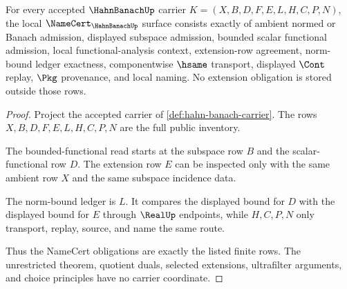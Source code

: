 \begin{theorem}
\label{thm:hahn-banach-namecert-obligations}
For every accepted $\HahnBanachUp$ carrier $K=(X,B,D,F,E,L,H,C,P,N)$, the local $\NameCert_{\HahnBanachUp}$ surface consists exactly of ambient normed or Banach admission, displayed subspace admission, bounded scalar functional admission, local functional-analysis context, extension-row agreement, norm-bound ledger exactness, componentwise $\hsame$ transport, displayed $\Cont$ replay, $\Pkg$ provenance, and local naming. No extension obligation is stored outside those rows.
\end{theorem}
\begin{proof}
Project the accepted carrier of \autoref{def:hahn-banach-carrier}. The rows $X,B,D,F,E,L,H,C,P,N$ are the full public inventory.

The bounded-functional read starts at the subspace row $B$ and the scalar-functional row $D$. The extension row $E$ can be inspected only with the same ambient row $X$ and the same subspace incidence data.

The norm-bound ledger is $L$. It compares the displayed bound for $D$ with the displayed bound for $E$ through $\RealUp$ endpoints, while $H,C,P,N$ only transport, replay, source, and name the same route.

Thus the NameCert obligations are exactly the listed finite rows. The unrestricted theorem, quotient duals, selected extensions, ultrafilter arguments, and choice principles have no carrier coordinate.
\end{proof}

